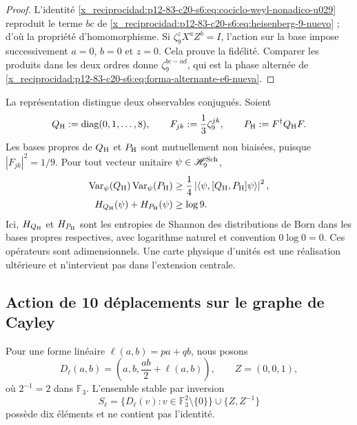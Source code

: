 \begin{proof}
L’identité \eqref{x_reciprocidad:p12-83-c20-s6:eq:cociclo-weyl-nonadico-u029} reproduit le terme
\(bc\) de \eqref{x_reciprocidad:p12-83-c20-s6:eq:heisenberg-9-nuevo} ; d’où la propriété
d’homomorphisme. Si \(\zeta_9^zX^aZ^b=I\), l’action sur la base impose
successivement \(a=0\), \(b=0\) et \(z=0\). Cela prouve la fidélité. Comparer
les produits dans les deux ordres donne
\(\zeta_9^{bc-ad}\), qui est la phase alternée de
\eqref{x_reciprocidad:p12-83-c20-s6:eq:forma-alternante-e6-nueva}.
\end{proof}

La représentation distingue deux observables conjugués. Soient
\[
 Q_{\rm H}:=\operatorname{diag}(0,1,\ldots,8),
 \qquad
 F_{jk}:=\frac13\zeta_9^{jk},
 \qquad
 P_{\rm H}:=F^\dagger Q_{\rm H}F.
\]
Les bases propres de \(Q_{\rm H}\) et \(P_{\rm H}\) sont mutuellement non biaisées, puisque \(|F_{jk}|^2=1/9\). Pour tout vecteur unitaire \(\psi\in\mathscr H_9^{\rm Sch}\),
\begin{align}
 \operatorname{Var}_\psi(Q_{\rm H})
 \operatorname{Var}_\psi(P_{\rm H})
 &\ge
 \frac14\left|
 \langle\psi,[Q_{\rm H},P_{\rm H}]\psi\rangle
 \right|^2,
 \label{x_reciprocidad:p12-83-c20-s6:eq:incertidumbre-weyl-u029}\\
 H_{Q_{\rm H}}(\psi)+H_{P_{\rm H}}(\psi)
 &\ge\log9.
 \label{x_reciprocidad:p12-83-c20-s6:eq:incertidumbre-entropica-weyl-u029}
\end{align}
Ici, \(H_{Q_{\rm H}}\) et \(H_{P_{\rm H}}\) sont les entropies de Shannon
des distributions de Born dans les bases propres respectives,
avec logarithme naturel et convention \(0\log0=0\).
Ces opérateurs sont adimensionnels. Une carte physique d’unités est une
réalisation ultérieure et n’intervient pas dans l’extension centrale.


\subsection{Action de 10 déplacements sur le graphe de Cayley}

Pour une forme linéaire \(\ell(a,b)=pa+qb\), nous posons
\[
 D_\ell(a,b)=\left(a,b,\frac{ab}{2}+\ell(a,b)\right),
 \qquad Z=(0,0,1),
\]
où \(2^{-1}=2\) dans \(\mathbb F_3\). L'ensemble stable par inversion
\begin{equation}
 S_\ell=
 \{D_\ell(v):v\in\mathbb F_3^2\setminus\{0\}\}
 \cup\{Z,Z^{-1}\}
 \label{x_reciprocidad:p12-83-c20-s6:eq:conjunto-conexion-e6}
\end{equation}
possède dix éléments et ne contient pas l'identité.

